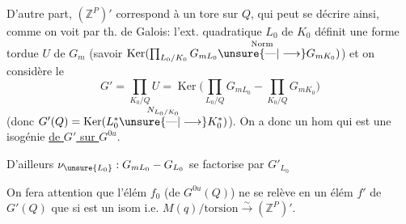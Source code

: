 D'autre part, $(\mathbb Z^P)'$ correspond à un tore sur $Q$, qui peut se décrire ainsi, comme on voit par th. de Galois: l'ext. quadratique $L_0$ de $K_0$ définit une forme tordue $U$ de $G_m$ (savoir $\operatorname{Ker}(\prod_{L_0/K_0}G_{mL_0}\overset{\text{Norm}}{\unsure{\text{—}|\longrightarrow}}G_{mK_0})$) et on considère le
\[
G'=\prod_{K_0/Q}U=\operatorname{Ker}\bigl(\prod_{L_0/Q}G_{mL_0}\mathbin{-}\prod_{K_0/Q}G_{mK_0}\bigr)
\]
(donc $G'(Q)=\operatorname{Ker}(L_0^*\overset{N_{L_0/K_0}}{\unsure{\text{—}|\longrightarrow}}K_0^*)$). On a donc un hom
qui est une isogénie \uline{de $G'$ sur $G^{0u}$}.

D'ailleurs $\nu_{\unsure{L_0}}:G_{mL_0}\mathbin{-}G_{L_0}$ se factorise par $G'_{L_0}$

On fera attention que l'élém $f_0$  (de $G^{0u}(Q)$) ne se relève en un élém  $f'$ de $G'(Q)$ que si \inserted{$\varphi$} est un isom i.e. $M(q)/\text{torsion}\xrightarrow{\sim}(\mathbb Z^P)'$.
